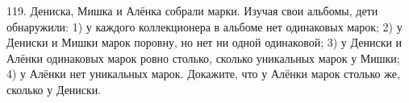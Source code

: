 119. Дениска, Мишка и Алёнка собрали марки. Изучая свои альбомы, дети обнаружили: 1) у каждого коллекционера в альбоме нет одинаковых марок; 2) у Дениски и Мишки марок поровну, но нет ни одной одинаковой; 3) у Дениски и Алёнки одинаковых марок ровно столько, сколько уникальных марок у Мишки; 4) у Алёнки нет уникальных марок. Докажите, что у Алёнки марок столько же, сколько у Дениски.\\
